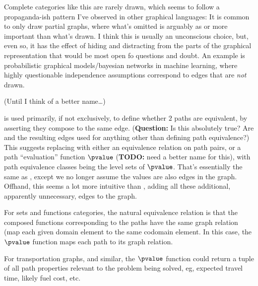 \documentclass[11pt,openany]{book}
\begin{document}
Complete categories like this are rarely drawn,
which seems to follow a propaganda-ish pattern 
I've observed in other graphical languages:
It is common to only draw partial graphs,
where what's omitted is arguably as or more important 
than what's drawn.
I think this is usually an unconscious choice,
but, even so, it has the effect of hiding and distracting 
from the parts of the graphical representation that would
be most open fo questions and doubt.
An example is probabilistic graphical models/bayesian networks
in machine learning, where highly questionable
independence assumptions correspond to edges that 
are \textsl{not} drawn.

\label{sec:Kategory_from_digraph}

(Until I think of a better name\ldots)

\compose is used primarily, if not exclusively,
to define whether $2$ paths are equivalent, by asserting they 
compose to the same edge.
(\textbf{Question:} Is this absolutely true?
Are \compose and the resulting edges
used for anything other than defining path equivalence?)
This suggests replacing \compose with 
either an equivalence relation on path pairs,
or a path ``evaluation'' function $\pvalue$
(\textbf{TODO:} need a better name for this),
with path equivalence classes
being the level sets of $\pvalue$.
That's essentially the same as \compose,
except we no longer assume the values are also edges in the graph.
Offhand, this seems a lot more intuitive than \compose,
adding all these additional, apparently unnecessary, edges to
the graph.

For sets and functions categories, the natural equivalence relation
is that the composed functions corresponding to the paths 
have the same graph relation (map each given domain element to the 
same codomain element. 
In this case, the $\pvalue$ function maps each path
to its graph relation.

For transportation graphs, and similar, the $\pvalue$ 
function could return a tuple of all path properties relevant to
the problem being solved, eg,  expected travel time, likely fuel 
cost, etc.
\end{document}
